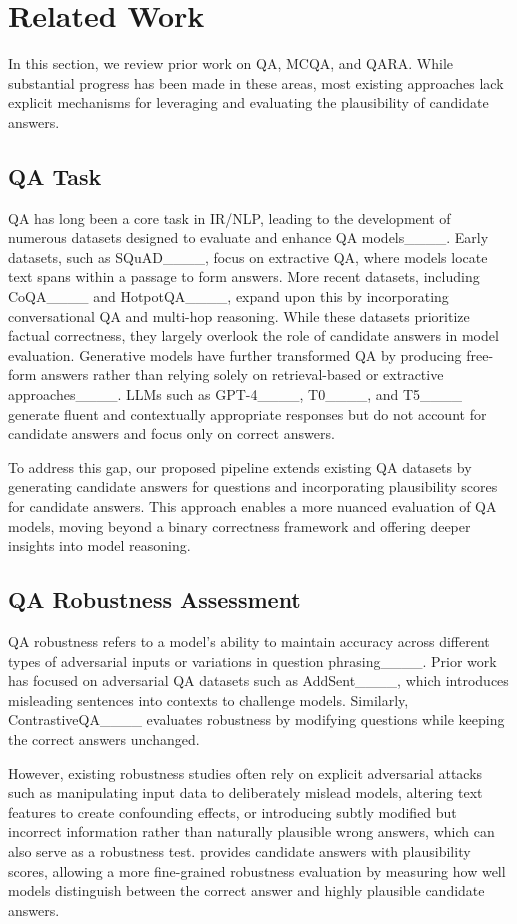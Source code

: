 \section{Related Work}
\label{s:related_work}
In this section, we review prior work on QA, MCQA, and QARA. While substantial progress has been made in these areas, most existing approaches lack explicit mechanisms for leveraging and evaluating the plausibility of candidate answers.

\subsection{QA Task}
QA has long been a core task in IR/NLP, leading to the development of numerous datasets designed to evaluate and enhance QA models____. Early datasets, such as SQuAD____, focus on extractive QA, where models locate text spans within a passage to form answers. More recent datasets, including CoQA____ and HotpotQA____, expand upon this by incorporating conversational QA and multi-hop reasoning. While these datasets prioritize factual correctness, they largely overlook the role of candidate answers in model evaluation.
Generative models have further transformed QA by producing free-form answers rather than relying solely on retrieval-based or extractive approaches____. LLMs such as GPT-4____, T0____, and T5____ generate fluent and contextually appropriate responses but do not account for candidate answers and focus only on correct answers.

To address this gap, our proposed pipeline extends existing QA datasets by generating candidate answers for questions and incorporating plausibility scores for candidate answers. This approach enables a more nuanced evaluation of QA models, moving beyond a binary correctness framework and offering deeper insights into model reasoning.

\subsection{QA Robustness Assessment}
QA robustness refers to a model’s ability to maintain accuracy across different types of adversarial inputs or variations in question phrasing____. Prior work has focused on adversarial QA datasets such as AddSent____, which introduces misleading sentences into contexts to challenge models. Similarly, ContrastiveQA____ evaluates robustness by modifying questions while keeping the correct answers unchanged. 

However, existing robustness studies often rely on explicit adversarial attacks such as manipulating input data to deliberately mislead models, altering text features to create confounding effects, or introducing subtly modified but incorrect information rather than naturally plausible wrong answers, which can also serve as a robustness test. \datasetname provides candidate answers with plausibility scores, allowing a more fine-grained robustness evaluation by measuring how well models distinguish between the correct answer and highly plausible candidate answers.

